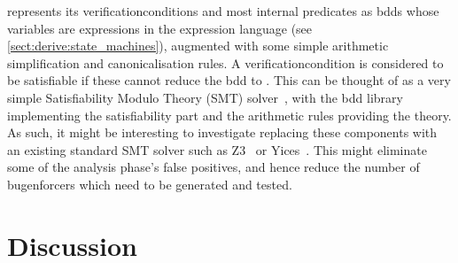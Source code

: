 {\Technique} represents its \glspl{verificationcondition} and most
internal predicates as \glspl{bdd} whose variables are expressions in
the {\StateMachine} expression language (see
\autoref{sect:derive:state_machines}), augmented with some simple
arithmetic simplification and canonicalisation rules.  A
\gls{verificationcondition} is considered to be satisfiable if these
cannot reduce the \gls{bdd} to \false.  This can be thought of as a
very simple Satisfiability Modulo Theory (SMT)
solver~\cite{Barrett2009}, with the \gls{bdd} library implementing the
satisfiability part and the arithmetic rules providing the theory.  As
such, it might be interesting to investigate replacing these
components with an existing standard SMT solver such as
Z3~\cite{FFFMoura2008} or Yices~\cite{FFFDutertre2006}.  This might
eliminate some of the analysis phase's false positives, and hence
reduce the number of \glspl{bugenforcer} which need to be generated
and tested.

\section{Discussion}

